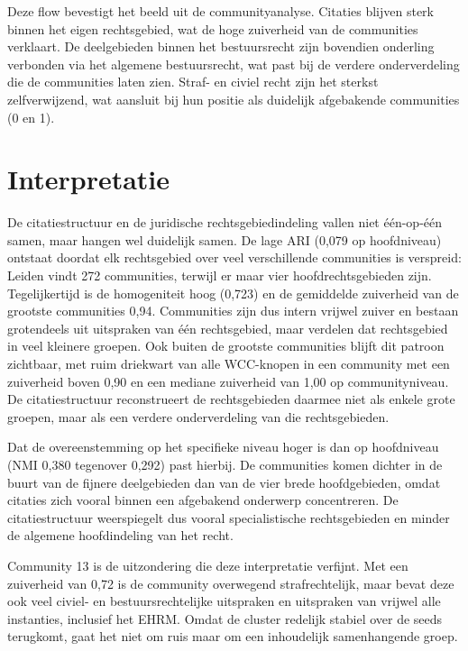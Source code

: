 \documentclass[a4paper, 12pt]{report}
\begin{document}
Deze flow bevestigt het beeld uit de communityanalyse. Citaties blijven sterk binnen het eigen rechtsgebied, wat de hoge zuiverheid van de communities verklaart. De deelgebieden binnen het bestuursrecht zijn bovendien onderling verbonden via het algemene bestuursrecht, wat past bij de verdere onderverdeling die de communities laten zien. Straf- en civiel recht zijn het sterkst zelfverwijzend, wat aansluit bij hun positie als duidelijk afgebakende communities (0 en 1).

\section{Interpretatie}
De citatiestructuur en de juridische rechtsgebiedindeling vallen niet één-op-één samen, maar hangen wel duidelijk samen. De lage ARI (0,079 op hoofdniveau) ontstaat doordat elk rechtsgebied over veel verschillende communities is verspreid: Leiden vindt 272 communities, terwijl er maar vier hoofdrechtsgebieden zijn. Tegelijkertijd is de homogeniteit hoog (0,723) en de gemiddelde zuiverheid van de grootste communities 0,94. Communities zijn dus intern vrijwel zuiver en bestaan grotendeels uit uitspraken van één rechtsgebied, maar verdelen dat rechtsgebied in veel kleinere groepen. Ook buiten de grootste communities blijft dit patroon zichtbaar, met ruim driekwart van alle WCC-knopen in een community met een zuiverheid boven 0,90 en een mediane zuiverheid van 1,00 op communityniveau. De citatiestructuur reconstrueert de rechtsgebieden daarmee niet als enkele grote groepen, maar als een verdere onderverdeling van die rechtsgebieden.

Dat de overeenstemming op het specifieke niveau hoger is dan op hoofdniveau (NMI 0,380 tegenover 0,292) past hierbij. De communities komen dichter in de buurt van de fijnere deelgebieden dan van de vier brede hoofdgebieden, omdat citaties zich vooral binnen een afgebakend onderwerp concentreren. De citatiestructuur weerspiegelt dus vooral specialistische rechtsgebieden en minder de algemene hoofdindeling van het recht.

Community 13 is de uitzondering die deze interpretatie verfijnt. Met een zuiverheid van 0,72 is de community overwegend strafrechtelijk, maar bevat deze ook veel civiel- en bestuursrechtelijke uitspraken en uitspraken van vrijwel alle instanties, inclusief het EHRM. Omdat de cluster redelijk stabiel over de seeds terugkomt, gaat het niet om ruis maar om een inhoudelijk samenhangende groep.


\end{document}
